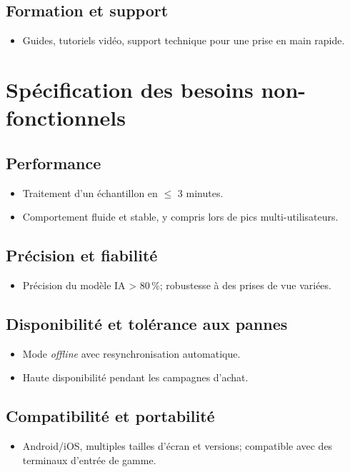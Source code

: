 \documentclass[12pt,a4paper]{report}
\begin{document}
\subsection*{Formation et support}
\begin{itemize}
    \item Guides, tutoriels vidéo, support technique pour une prise en main rapide.
\end{itemize}
\cleardoublepage
\section{Spécification des besoins non-fonctionnels}

\subsection*{Performance}
\begin{itemize}
    \item Traitement d’un échantillon en \(\le\) 3 minutes.
    \item Comportement fluide et stable, y compris lors de pics multi-utilisateurs.
\end{itemize}

\subsection*{Précision et fiabilité}
\begin{itemize}
    \item Précision du modèle IA > 80\,\%; robustesse à des prises de vue variées.
\end{itemize}

\subsection*{Disponibilité et tolérance aux pannes}
\begin{itemize}
    \item Mode \textit{offline} avec resynchronisation automatique.
    \item Haute disponibilité pendant les campagnes d’achat.
\end{itemize}

\subsection*{Compatibilité et portabilité}
\begin{itemize}
    \item Android/iOS, multiples tailles d’écran et versions; compatible avec des terminaux d’entrée de gamme.
\end{itemize}
\end{document}
